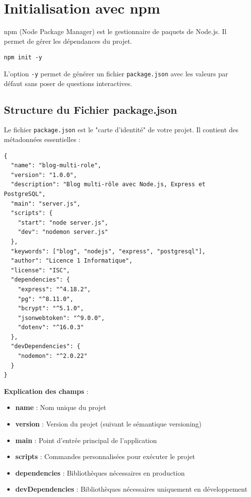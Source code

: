 \documentclass[a4paper,12pt]{book}
\begin{document}
\section{Initialisation avec npm}

npm (Node Package Manager) est le gestionnaire de paquets de Node.js. Il permet de gérer les dépendances du projet.

\begin{lstlisting}[style=bash, caption=Initialisation du projet avec npm]
npm init -y
\end{lstlisting}

L'option \texttt{-y} permet de générer un fichier \texttt{package.json} avec les valeurs par défaut sans poser de questions interactives.

\subsection{Structure du Fichier package.json}

Le fichier \texttt{package.json} est le "carte d'identité" de votre projet. Il contient des métadonnées essentielles :

\begin{lstlisting}[style=javascript, caption=Exemple de package.json]
{
  "name": "blog-multi-role",
  "version": "1.0.0",
  "description": "Blog multi-rôle avec Node.js, Express et PostgreSQL",
  "main": "server.js",
  "scripts": {
    "start": "node server.js",
    "dev": "nodemon server.js"
  },
  "keywords": ["blog", "nodejs", "express", "postgresql"],
  "author": "Licence 1 Informatique",
  "license": "ISC",
  "dependencies": {
    "express": "^4.18.2",
    "pg": "^8.11.0",
    "bcrypt": "^5.1.0",
    "jsonwebtoken": "^9.0.0",
    "dotenv": "^16.0.3"
  },
  "devDependencies": {
    "nodemon": "^2.0.22"
  }
}
\end{lstlisting}

\begin{definitionbox}
    \textbf{Explication des champs} :
    \begin{itemize}
        \item \textbf{name} : Nom unique du projet
        \item \textbf{version} : Version du projet (suivant le sémantique versioning)
        \item \textbf{main} : Point d'entrée principal de l'application
        \item \textbf{scripts} : Commandes personnalisées pour exécuter le projet
        \item \textbf{dependencies} : Bibliothèques nécessaires en production
        \item \textbf{devDependencies} : Bibliothèques nécessaires uniquement en développement
    \end{itemize}
\end{definitionbox}
\end{document}
